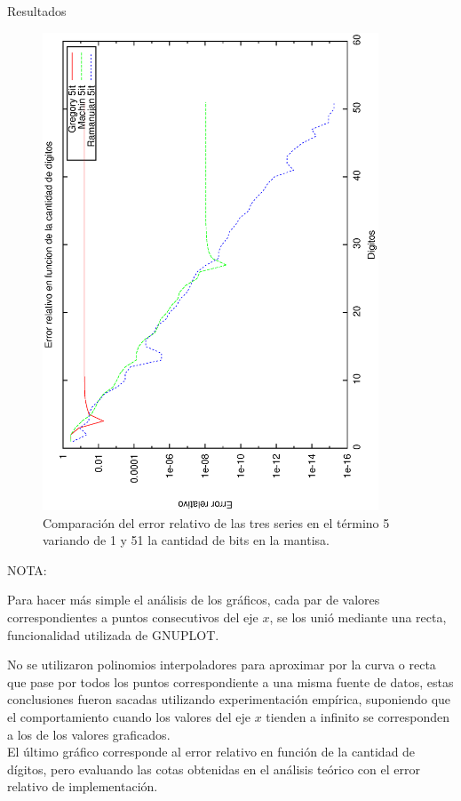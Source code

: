\begin{section}{Resultados}
	\begin{figure}[H]
	  \centering
		\includegraphics[width=10cm,angle=-90]{graficos/comparacion_5it_1a51p.eps}
	  \caption{Comparación del error relativo de las tres series en el término 5 variando de 1 y 51 la cantidad de bits en la mantisa.}
	  \label{fig:5it}
	\end{figure}
	
	\VSP
	
	NOTA: 
	
	Para hacer más simple el análisis de los gráficos, cada par de valores correspondientes a puntos consecutivos del eje $x$, se los unió mediante una recta, funcionalidad utilizada de GNUPLOT.
	
	No se utilizaron polinomios interpoladores para aproximar por la curva o recta que pase por todos los puntos correspondiente a una misma fuente de datos, estas conclusiones fueron sacadas utilizando experimentación empírica, suponiendo que el comportamiento cuando los valores del eje $x$ tienden a infinito se corresponden a los de los valores graficados.\\

	El último gráfico corresponde al error relativo en función de la cantidad de dígitos, pero evaluando las cotas obtenidas en el análisis teórico con el error relativo de implementación.
	

\end{section}
